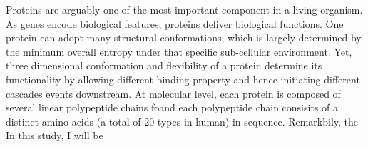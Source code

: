 Proteins are arguably one of the most important component in a living organism. As genes encode biological features, proteins deliver biological functions. One protein can adopt many structural conformations, which is largely determined by the minimum overall entropy under that specific sub-cellular environment. Yet, three dimensional conformation and flexibility of a protein determine its functionality by allowing different binding property and hence initiating different cascades events downstream. At molecular level, each protein is composed of several linear polypeptide chains foand each polypeptide chain consisits of a distinct amino acids (a total of 20 types in human) in sequence. Remarkbily, the  In this study, I will be 